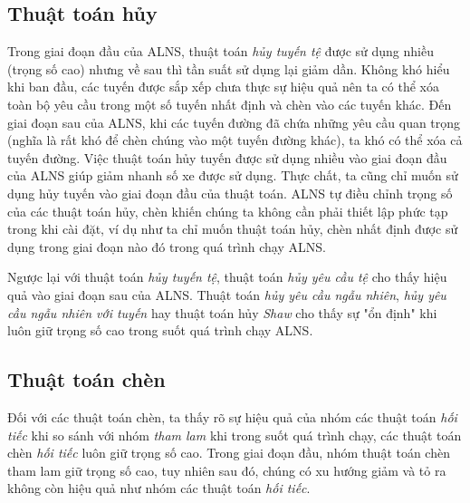 \subsection*{Thuật toán hủy}
Trong giai đoạn đầu của ALNS, thuật toán \textit{hủy tuyến tệ} được sử dụng nhiều (trọng số cao) nhưng về sau thì tần suất sử dụng lại giảm dần. Không khó hiểu khi ban đầu, các tuyến được sắp xếp chưa thực sự hiệu quả nên ta có thể xóa toàn bộ yêu cầu trong một số tuyến nhất định và chèn vào các tuyến khác. Đến giai đoạn sau của ALNS, khi các tuyến đường đã chứa những yêu cầu quan trọng (nghĩa là rất khó để chèn chúng vào một tuyến đường khác), ta khó có thể xóa cả tuyến đường. Việc thuật toán hủy tuyến được sử dụng nhiều vào giai đoạn đầu của ALNS giúp giảm nhanh số xe được sử dụng. Thực chất, ta cũng chỉ muốn sử dụng hủy tuyến vào giai đoạn đầu của thuật toán. ALNS tự điều chỉnh trọng số của các thuật toán hủy, chèn khiến chúng ta không cần phải thiết lập phức tạp trong khi cài đặt, ví dụ như ta chỉ muốn thuật toán hủy, chèn nhất định được sử dụng trong giai đoạn nào đó trong quá trình chạy ALNS. 

Ngược lại với thuật toán \textit{hủy tuyến tệ}, thuật toán \textit{hủy yêu cầu tệ} cho thấy hiệu quả vào giai đoạn sau của ALNS. Thuật toán \textit{hủy yêu cầu ngẫu nhiên}, \textit{hủy yêu cầu ngẫu nhiên với tuyến} hay thuật toán hủy \textit{Shaw} cho thấy sự "ổn định" khi luôn giữ trọng số cao trong suốt quá trình chạy ALNS.

\subsection*{Thuật toán chèn}
Đối với các thuật toán chèn, ta thấy rõ sự hiệu quả của nhóm các thuật toán \textit{hối tiếc} khi so sánh với nhóm \textit{tham lam} khi trong suốt quá trình chạy, các thuật toán chèn \textit{hối tiếc} luôn giữ trọng số cao. Trong giai đoạn đầu, nhóm thuật toán chèn tham lam giữ trọng số cao, tuy nhiên sau đó, chúng có xu hướng giảm và tỏ ra không còn hiệu quả như nhóm các thuật toán \textit{hối tiếc}.
